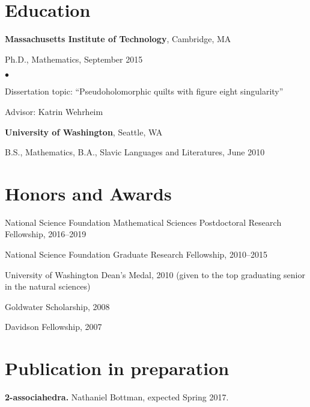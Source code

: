 \documentclass[margin,line]{res}
\newenvironment{list1}{
  \begin{list}{\ding{113}}{%
      \setlength{\itemsep}{0in}
      \setlength{\parsep}{0in} \setlength{\parskip}{0in}
      \setlength{\topsep}{0in} \setlength{\partopsep}{0in} 
      \setlength{\leftmargin}{0.17in}}}{\end{list}}
\newenvironment{list2}{
  \begin{list}{$\bullet$}{%
      \setlength{\itemsep}{0in}
      \setlength{\parsep}{0in} \setlength{\parskip}{0in}
      \setlength{\topsep}{0in} \setlength{\partopsep}{0in} 
      \setlength{\leftmargin}{0.2in}}}{\end{list}}
\begin{document}
\begin{resume}
\section{\sc Education}
{\bf Massachusetts Institute of Technology}, Cambridge, MA \\
\vspace*{-.1in}
\begin{list1}
\item[] Ph.D., Mathematics, September 2015
\begin{list2}
\vspace*{.05in}
\item Dissertation topic:  ``Pseudoholomorphic quilts with figure eight singularity'' 
\item Advisor:  Katrin Wehrheim
\end{list2}
\end{list1}

{\bf University of Washington}, Seattle, WA\\
\vspace*{-.1in}
\begin{list1}
\item[] B.S., Mathematics, B.A., Slavic Languages and Literatures, June 2010
\end{list1}


\section{\sc Honors and Awards}
National Science Foundation Mathematical Sciences Postdoctoral Research Fellowship, 2016--2019

National Science Foundation Graduate Research Fellowship, 2010--2015

University of Washington Dean's Medal, 2010 (given to the top graduating senior in the natural sciences)

Goldwater Scholarship, 2008

Davidson Fellowship, 2007


\section{\sc Publication in preparation}
{\bf 2-associahedra.}  Nathaniel Bottman, expected Spring 2017.


\end{resume}
\end{document}
